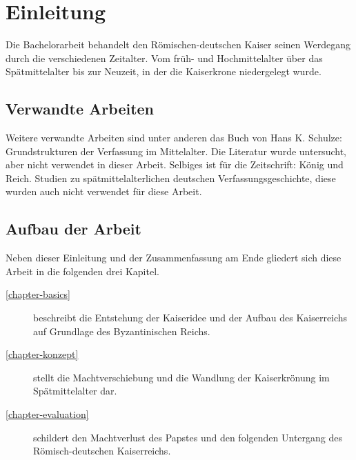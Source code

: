 
\chapter{Einleitung}

Die Bachelorarbeit behandelt den Römischen-deutschen Kaiser seinen Werdegang durch die verschiedenen Zeitalter. Vom früh- und Hochmittelalter über das Spätmittelalter bis zur Neuzeit, in der die Kaiserkrone niedergelegt wurde.

\section{Verwandte Arbeiten}

Weitere verwandte Arbeiten sind unter anderen das Buch von Hans K. Schulze: Grundstrukturen der Verfassung im Mittelalter. Die Literatur wurde untersucht, aber nicht verwendet in dieser Arbeit. Selbiges ist für die Zeitschrift: König und Reich. Studien zu spätmittelalterlichen deutschen Verfassungsgeschichte, diese wurden auch nicht verwendet für diese Arbeit.

\section{Aufbau der Arbeit}

Neben dieser Einleitung und der Zusammenfassung am Ende gliedert sich diese Arbeit in die folgenden drei Kapitel.
\begin{description}
  \item[\ref{chapter-basics}] beschreibt die Entstehung der Kaiseridee und der Aufbau des Kaiserreichs auf Grundlage des Byzantinischen Reichs.
  \item[\ref{chapter-konzept}] stellt die Machtverschiebung und die Wandlung der Kaiserkrönung im Spätmittelalter dar.
  \item[\ref{chapter-evaluation}] schildert den Machtverlust des Papstes und den folgenden Untergang des Römisch-deutschen Kaiserreichs.
\end{description}

